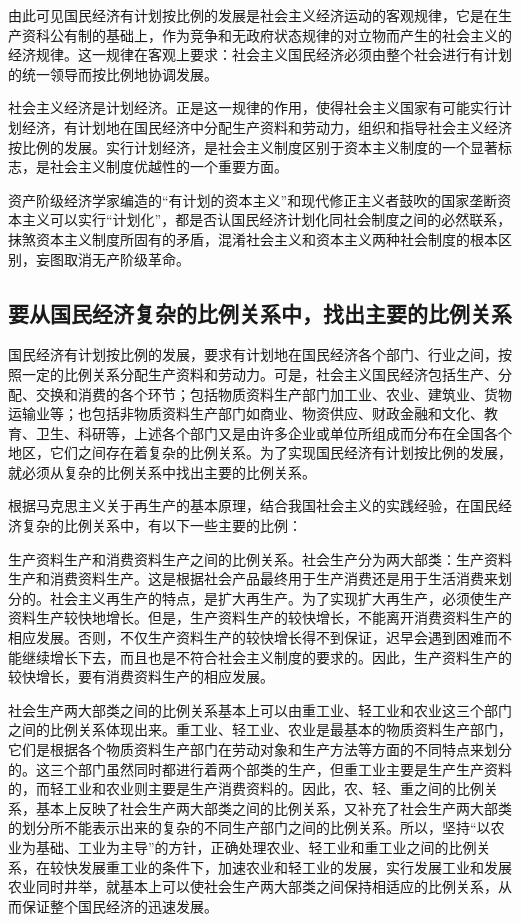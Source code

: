 \documentclass{book}
\begin{document}
由此可见国民经济有计划按比例的发展是社会主义经济运动的客观规律，它是在生产资科公有制的基础上，作为竞争和无政府状态规律的对立物而产生的社会主义的经济规律。这一规律在客观上要求：社会主义国民经济必须由整个社会进行有计划的统一领导而按比例地协调发展。

社会主义经济是计划经济。正是这一规律的作用，使得社会主义国家有可能实行计划经济，有计划地在国民经济中分配生产资料和劳动力，组织和指导社会主义经济按比例的发展。实行计划经济，是社会主义制度区别于资本主义制度的一个显著标志，是社会主义制度优越性的一个重要方面。

资产阶级经济学家编造的“有计划的资本主义”和现代修正主义者鼓吹的国家垄断资本主义可以实行“计划化”，都是否认国民经济计划化同社会制度之间的必然联系，抹煞资本主义制度所固有的矛盾，混淆社会主义和资本主义两种社会制度的根本区别，妄图取消无产阶级革命。

\subsection{要从国民经济复杂的比例关系中，找出主要的比例关系}

国民经济有计划按比例的发展，要求有计划地在国民经济各个部门、行业之间，按照一定的比例关系分配生产资料和劳动力。可是，社会主义国民经济包括生产、分配、交换和消费的各个环节；包括物质资料生产部门加工业、农业、建筑业、货物运输业等；也包括非物质资料生产部门如商业、物资供应、财政金融和文化、教育、卫生、科研等，上述各个部门又是由许多企业或单位所组成而分布在全国各个地区，它们之间存在着复杂的比例关系。为了实现国民经济有计划按比例的发展，就必须从复杂的比例关系中找出主要的比例关系。

根据马克思主义关于再生产的基本原理，结合我国社会主义的实践经验，在国民经济复杂的比例关系中，有以下一些主要的比例：

生产资料生产和消费资料生产之间的比例关系。社会生产分为两大部类：生产资料生产和消费资料生产。这是根据社会产品最终用于生产消费还是用于生活消费来划分的。社会主义再生产的特点，是扩大再生产。为了实现扩大再生产，必须使生产资料生产较快地增长。但是，生产资料生产的较快增长，不能离开消费资料生产的相应发展。否则，不仅生产资料生产的较快增长得不到保证，迟早会遇到困难而不能继续增长下去，而且也是不符合社会主义制度的要求的。因此，生产资料生产的较快增长，要有消费资料生产的相应发展。

社会生产两大部类之间的比例关系基本上可以由重工业、轻工业和农业这三个部门之间的比例关系体现出来。重工业、轻工业、农业是最基本的物质资料生产部门，它们是根据各个物质资料生产部门在劳动对象和生产方法等方面的不同特点来划分的。这三个部门虽然同时都进行着两个部类的生产，但重工业主要是生产生产资料的，而轻工业和农业则主要是生产消费资料的。因此，农、轻、重之间的比例关系，基本上反映了社会生产两大部类之间的比例关系，又补充了社会生产两大部类的划分所不能表示出来的复杂的不同生产部门之间的比例关系。所以，坚持“以农业为基础、工业为主导”的方针，正确处理农业、轻工业和重工业之间的比例关系，在较快发展重工业的条件下，加速农业和轻工业的发展，实行发展工业和发展农业同时井举，就基本上可以使社会生产两大部类之间保持相适应的比例关系，从而保证整个国民经济的迅速发展。
\end{document}
